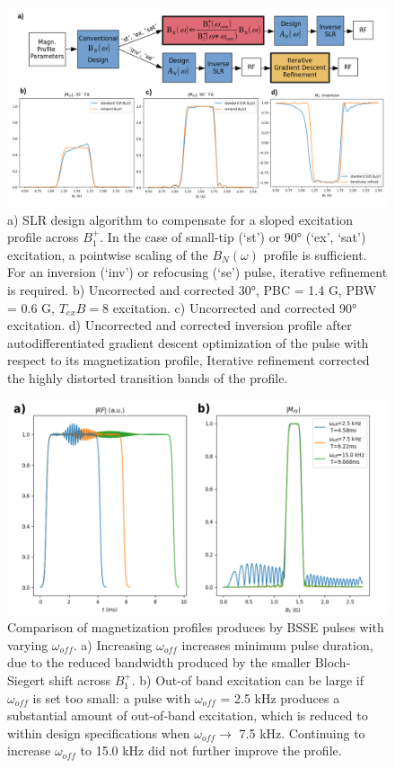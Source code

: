 \begin{figure}[h]
\centering
\includegraphics[width=1\textwidth]{figures/beta_filt_flowchart.png}
\caption{a) SLR design algorithm to compensate for a sloped excitation profile across $B_1^+$. In the case of small-tip (`st') or 90° (`ex', `sat') excitation, a
pointwise scaling of the $B_N (\omega)$ profile is sufficient. 
For an inversion (`inv') or refocusing (`se') pulse, iterative refinement is required. 
b) Uncorrected and corrected 30°, PBC = 1.4 G, PBW = 0.6 G, $T_{ex}B=8$ excitation.
c) Uncorrected and corrected 90° excitation. 
d) Uncorrected and corrected inversion profile after
autodifferentiated gradient descent optimization of the pulse with respect to its magnetization profile, Iterative refinement corrected the highly distorted transition bands of the profile.}
\label{fig:ramp}
\end{figure}

\begin{figure}[h]
\centering
\includegraphics[width=1\textwidth]{figures/bs_offset_comparison_processed.png}
\caption{Comparison of magnetization profiles produces by BSSE pulses with varying $\omega_{off}$. 
a) Increasing $\omega_{off}$ increases minimum pulse duration, 
due to the reduced bandwidth produced by the smaller Bloch-Siegert shift across $B_1^+$. 
b) Out-of band excitation can be large if $\omega_{off}$ is set too small: 
a pulse with $\omega_{off}$ = 2.5 kHz produces a substantial amount of out-of-band excitation, 
which is reduced to within design specifications when $\omega_{off} \rightarrow$ 7.5 kHz. 
Continuing to increase $\omega_{off}$ to 15.0 kHz did not further improve the profile.}
\label{fig:bsse_offres_comp}
\end{figure}


